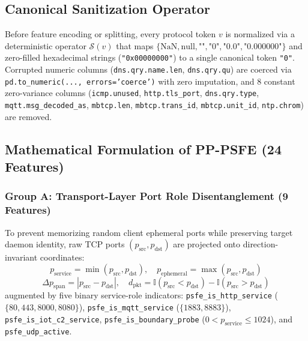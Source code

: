 \documentclass[conference]{IEEEtran}
\begin{document}
\subsection{Canonical Sanitization Operator}
Before feature encoding or splitting, every protocol token $v$ is normalized via a deterministic operator $\mathcal{S}(v)$ that maps $\{\text{NaN}, \text{null}, \text{""}, \text{"0"}, \text{"0.0"}, \text{"0.000000"}\}$ and zero-filled hexadecimal strings (\texttt{"0x00000000"}) to a single canonical token \texttt{"0"}. Corrupted numeric columns (\texttt{dns.qry.name.len}, \texttt{dns.qry.qu}) are coerced via \texttt{pd.to\_numeric(..., errors='coerce')} with zero imputation, and 8 constant zero-variance columns (\texttt{icmp.unused}, \texttt{http.tls\_port}, \texttt{dns.qry.type}, \texttt{mqtt.msg\_decoded\_as}, \texttt{mbtcp.len}, \texttt{mbtcp.trans\_id}, \texttt{mbtcp.unit\_id}, \texttt{ntp.chrom}) are removed.

\subsection{Mathematical Formulation of PP-PSFE (24 Features)}
\subsubsection{Group A: Transport-Layer Port Role Disentanglement (9 Features)}
To prevent memorizing random client ephemeral ports while preserving target daemon identity, raw TCP ports $(p_{\text{src}}, p_{\text{dst}})$ are projected onto direction-invariant coordinates:
\begin{equation}
p_{\text{service}} = \min(p_{\text{src}}, p_{\text{dst}}), \quad p_{\text{ephemeral}} = \max(p_{\text{src}}, p_{\text{dst}})
\end{equation}
\begin{equation}
\Delta p_{\text{span}} = |p_{\text{src}} - p_{\text{dst}}|, \quad d_{\text{pkt}} = \mathbb{I}(p_{\text{src}} < p_{\text{dst}}) - \mathbb{I}(p_{\text{src}} > p_{\text{dst}})
\end{equation}
augmented by five binary service-role indicators: \texttt{psfe\_is\_http\_service} ($\{80, 443, 8000, 8080\}$), \texttt{psfe\_is\_mqtt\_service} ($\{1883, 8883\}$), \texttt{psfe\_is\_iot\_c2\_service}, \texttt{psfe\_is\_boundary\_probe} ($0 < p_{\text{service}} \le 1024$), and \texttt{psfe\_udp\_active}.
\end{document}
